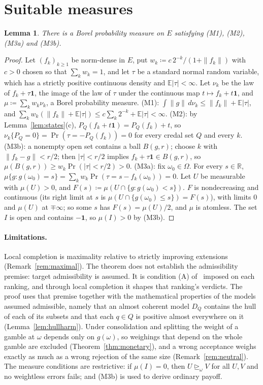 \documentclass[11pt]{article}
\newtheorem{lemma}[theorem]{Lemma}
\theoremstyle{definition}
\newcommand{\R}{\mathbb R}
\newcommand{\one}{\mathbf 1}
\newcommand{\sge}{\trianglerighteq}
\begin{document}
\section{Suitable measures}\label{sec:measures}

\begin{lemma}\label{lem:measures}
There is a Borel probability measure on $E$ satisfying (M1), (M2), {\color{red}(M3a) and (M3b)}.
\end{lemma}
\begin{proof}
Let $(f_k)_{k\ge1}$ be norm-dense in $E$, put $w_k\coloneqq c\,2^{-k}/(1+\|f_k\|)$ with $c>0$ chosen so that $\sum_kw_k=1$, and let $\tau$ be a standard normal random variable, which has a strictly positive continuous density and $\mathbb E|\tau|<\infty$. Let $\nu_k$ be the law of $f_k+\tau\one$, the image of the law of $\tau$ under the continuous map $t\mapsto f_k+t\one$, and $\mu\coloneqq\sum_kw_k\nu_k$, a Borel probability measure.
(M1): $\int\|g\|\,d\nu_k\le\|f_k\|+\mathbb E|\tau|$, and $\sum_kw_k(\|f_k\|+\mathbb E|\tau|)\le c\sum_k2^{-k}+\mathbb E|\tau|<\infty$.
(M2): by Lemma~\ref{lem:states}(c), $P_Q(f_k+t\one)=P_Q(f_k)+t$, so $\nu_k\{P_Q=0\}=\Pr(\tau=-P_Q(f_k))=0$ for every credal set $Q$ and every $k$.
(M3b): a nonempty open set contains a ball $B(g,r)$; choose $k$ with $\|f_k-g\|<r/2$; then $|\tau|<r/2$ implies $f_k+\tau\one\in B(g,r)$, so $\mu(B(g,r))\ge w_k\Pr(|\tau|<r/2)>0$.
{\color{red}(M3a): fix $\omega_0\in\Omega$. For every $s\in\R$, $\mu\{g:g(\omega_0)=s\}=\sum_kw_k\Pr(\tau=s-f_k(\omega_0))=0$. Let $U$ be measurable with $\mu(U)>0$, and $F(s)\coloneqq\mu(U\cap\{g:g(\omega_0)<s\})$. $F$ is nondecreasing and continuous (its right limit at $s$ is $\mu(U\cap\{g(\omega_0)\le s\})=F(s)$), with limits $0$ and $\mu(U)$ at $\mp\infty$; so some $s$ has $F(s)=\mu(U)/2$, and $\mu$ is atomless. The set $I$ is open and contains $-\one$, so $\mu(I)>0$ by (M3b).}
\end{proof}

\begingroup\color{red}
\paragraph{Limitations.}
Local completion is maximality relative to strictly improving extensions (Remark~\ref{rem:maximal}). The theorem does not establish the admissibility premise: target admissibility is assumed. It is condition (A) of~\cite{LDG} imposed on each ranking, and through local completion it shapes that ranking's verdicts. The proof uses that premise together with the mathematical properties of the models assumed admissible, namely that an almost coherent model $D_Q$ contains the hull of each of its subsets and that each $q\in Q$ is positive almost everywhere on it (Lemma~\ref{lem:hullharm}). Under consolidation and splitting the weight of a gamble at $\omega$ depends only on $g(\omega)$, so weighings that depend on the whole gamble are excluded (Theorem~\ref{thm:monetary}), and a wrong acceptance weighs exactly as much as a wrong rejection of the same size (Remark~\ref{rem:neutral}). The measure conditions are restrictive: if $\mu(I)=0$, then $U\sge_\omega V$ for all $U,V$ and no weightless errors fails; and (M3b) is used to derive ordinary payoff.
\endgroup
\end{document}
